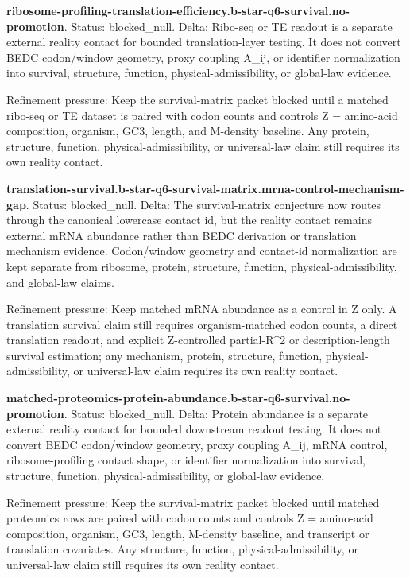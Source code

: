 \textbf{ribosome-profiling-translation-efficiency.b-star-q6-survival.no-promotion}. Status: blocked\_null. Delta: Ribo-seq or TE readout is a separate external reality contact for bounded translation-layer testing. It does not convert BEDC codon/window geometry, proxy coupling A\_ij, or identifier normalization into survival, structure, function, physical-admissibility, or global-law evidence.

Refinement pressure: Keep the survival-matrix packet blocked until a matched ribo-seq or TE dataset is paired with codon counts and controls Z = amino-acid composition, organism, GC3, length, and M-density baseline. Any protein, structure, function, physical-admissibility, or universal-law claim still requires its own reality contact.

\textbf{translation-survival.b-star-q6-survival-matrix.mrna-control-mechanism-gap}. Status: blocked\_null. Delta: The survival-matrix conjecture now routes through the canonical lowercase contact id, but the reality contact remains external mRNA abundance rather than BEDC derivation or translation mechanism evidence. Codon/window geometry and contact-id normalization are kept separate from ribosome, protein, structure, function, physical-admissibility, and global-law claims.

Refinement pressure: Keep matched mRNA abundance as a control in Z only. A translation survival claim still requires organism-matched codon counts, a direct translation readout, and explicit Z-controlled partial-R\textasciicircum{}2 or description-length survival estimation; any mechanism, protein, structure, function, physical-admissibility, or universal-law claim requires its own reality contact.

\textbf{matched-proteomics-protein-abundance.b-star-q6-survival.no-promotion}. Status: blocked\_null. Delta: Protein abundance is a separate external reality contact for bounded downstream readout testing. It does not convert BEDC codon/window geometry, proxy coupling A\_ij, mRNA control, ribosome-profiling contact shape, or identifier normalization into survival, structure, function, physical-admissibility, or global-law evidence.

Refinement pressure: Keep the survival-matrix packet blocked until matched proteomics rows are paired with codon counts and controls Z = amino-acid composition, organism, GC3, length, M-density baseline, and transcript or translation covariates. Any structure, function, physical-admissibility, or universal-law claim still requires its own reality contact.

